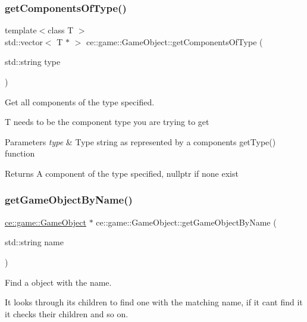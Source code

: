 \subsubsection{\texorpdfstring{get\+Components\+Of\+Type()}{getComponentsOfType()}}
{\footnotesize\ttfamily template$<$class T $>$ \\
std\+::vector$<$ T $\ast$ $>$ ce\+::game\+::\+Game\+Object\+::get\+Components\+Of\+Type (\begin{DoxyParamCaption}\item[{std\+::string}]{type }\end{DoxyParamCaption})\hspace{0.3cm}{\ttfamily [inline]}}



Get all components of the type specified. 

T needs to be the component type you are trying to get


\begin{DoxyParams}{Parameters}
{\em type} & Type string as represented by a components get\+Type() function \\
\hline
\end{DoxyParams}
\begin{DoxyReturn}{Returns}
A component of the type specified, nullptr if none exist 
\end{DoxyReturn}
\mbox{\label{classce_1_1game_1_1_game_object_a2fcc1608d7c352ba88a5fcc5d99eb5e2}} 
\subsubsection{\texorpdfstring{get\+Game\+Object\+By\+Name()}{getGameObjectByName()}}
{\footnotesize\ttfamily \hyperlink{classce_1_1game_1_1_game_object}{ce\+::game\+::\+Game\+Object} $\ast$ ce\+::game\+::\+Game\+Object\+::get\+Game\+Object\+By\+Name (\begin{DoxyParamCaption}\item[{std\+::string}]{name }\end{DoxyParamCaption})}



Find a object with the name. 

It looks through it\textquotesingle{}s children to find one with the matching name, if it can\textquotesingle{}t find it it checks their children and so on.


